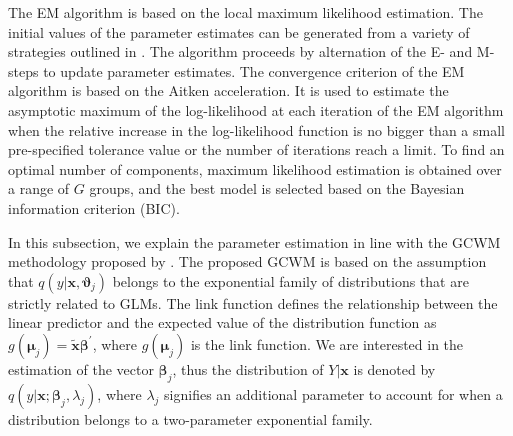 \documentclass[11pt,letterpaper]{article}
\numberwithin{equation}{section}
\numberwithin{equation}{section}
\numberwithin{equation}{section}
\newcommand{\xTilda}{\tilde{\bm{x}}}
\begin{document}
The EM algorithm is based on the local  maximum likelihood estimation. %
The initial values of the parameter estimates can be generated from a variety of strategies outlined in \cite{initialPaperGrassiaRef}. %
 The algorithm proceeds by alternation of the E- and M-steps to update parameter estimates. %
%
The convergence criterion of the EM algorithm is based on the Aitken acceleration. It is used to estimate the asymptotic maximum of the log-likelihood at each iteration of the EM algorithm when the relative increase in the log-likelihood function is no bigger than a small pre-specified tolerance value or the number of iterations reach a limit. %
To find an optimal number of components, maximum likelihood estimation is obtained over a range of $G$ groups, and the best model is selected based on the Bayesian information criterion (BIC).   %

In this subsection, we explain the parameter estimation in line with the GCWM methodology proposed by \cite{Ingrassia+Punzo+Vittadini+Minotti:2015}. The proposed GCWM  is based on the assumption that $q(y|\bm{x},\bm{\vartheta}_j)$ belongs to the exponential family of distributions that are strictly related to GLMs. The link function defines the relationship between the linear predictor and the expected value of the distribution function as $g(\bm{\mu}_j)= \xTilda \bm{\beta}^{'}$, where $g(\bm{\mu}_j)$ is the link function. We are interested in the estimation of the vector $\bm {\beta}_j$, thus the distribution of $Y|\bm{x}$ is denoted by $q(y|\bm{x}; \bm{\beta}_j, \lambda_j)$, where $\lambda_j$ signifies an additional parameter to account for when a distribution belongs to a two-parameter exponential family.
\end{document}
